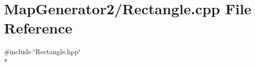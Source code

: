 \section{Map\-Generator2/\-Rectangle.cpp File Reference}
\label{_rectangle_8cpp}
{\ttfamily \#include \char`\"{}Rectangle.\-hpp\char`\"{}}\\*
